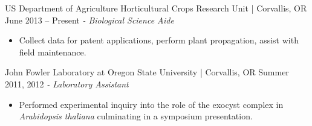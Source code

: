 US Department of Agriculture Horticultural Crops Research Unit | Corvallis, OR  \hfill  June 2013 – Present \newline
\textit{- Biological Science Aide}\\
  \vspace{-4.5mm}
 \begin{itemize}
 \item Collect data for patent applications, perform plant propagation, assist with field maintenance.
 \end{itemize}
  \vspace{-3.5mm}

 John Fowler Laboratory at Oregon State University | Corvallis, OR \hfill Summer 2011, 2012 \newline
\textit{- Laboratory Assistant} \\
 \vspace{-4.5mm}
 \begin{itemize}
 \item Performed experimental inquiry into the role of the exocyst complex in \textit{Arabidopsis thaliana} culminating in a symposium presentation.
 \end{itemize}
  \vspace{-3.5mm}
